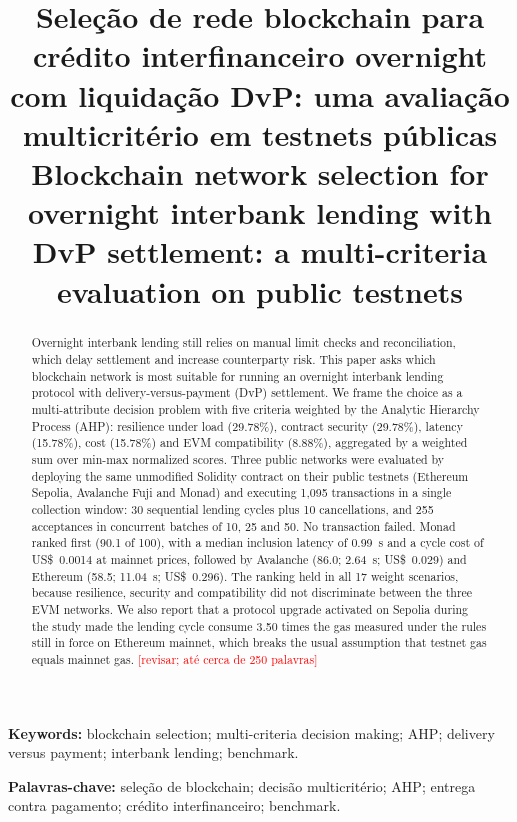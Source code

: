 \documentclass[10pt,a4paper]{article}
\title{Seleção de rede blockchain para crédito interfinanceiro overnight com liquidação DvP: uma avaliação multicritério em testnets públicas\\[0.6em]
\large Blockchain network selection for overnight interbank lending with DvP settlement: a multi-criteria evaluation on public testnets}
\author{\pendente{Autores omitidos na versão de avaliação}}
\date{}
\newcommand{\pendente}[1]{\textcolor{red}{[#1]}}
\begin{document}
\maketitle

\begin{otherlanguage}{english}
\begin{abstract}
Overnight interbank lending still relies on manual limit checks and reconciliation, which delay settlement and increase counterparty risk. This paper asks which blockchain network is most suitable for running an overnight interbank lending protocol with delivery-versus-payment (DvP) settlement. We frame the choice as a multi-attribute decision problem with five criteria weighted by the Analytic Hierarchy Process (AHP): resilience under load (29.78\%), contract security (29.78\%), latency (15.78\%), cost (15.78\%) and EVM compatibility (8.88\%), aggregated by a weighted sum over min-max normalized scores. Three public networks were evaluated by deploying the same unmodified Solidity contract on their public testnets (Ethereum Sepolia, Avalanche Fuji and Monad) and executing 1,095 transactions in a single collection window: 30 sequential lending cycles plus 10 cancellations, and 255 acceptances in concurrent batches of 10, 25 and 50. No transaction failed. Monad ranked first (90.1 of 100), with a median inclusion latency of 0.99~s and a cycle cost of US\$~0.0014 at mainnet prices, followed by Avalanche (86.0; 2.64~s; US\$~0.029) and Ethereum (58.5; 11.04~s; US\$~0.296). The ranking held in all 17 weight scenarios, because resilience, security and compatibility did not discriminate between the three EVM networks. We also report that a protocol upgrade activated on Sepolia during the study made the lending cycle consume 3.50 times the gas measured under the rules still in force on Ethereum mainnet, which breaks the usual assumption that testnet gas equals mainnet gas. \pendente{revisar; até cerca de 250 palavras}
\end{abstract}

\noindent\textbf{Keywords:} blockchain selection; multi-criteria decision making; AHP; delivery versus payment; interbank lending; benchmark.
\end{otherlanguage}

\vspace{0.5em}
\noindent\textbf{Palavras-chave:} seleção de blockchain; decisão multicritério; AHP; entrega contra pagamento; crédito interfinanceiro; benchmark.
\end{document}
